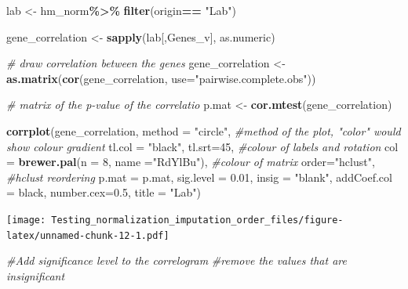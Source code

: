 \documentclass[
]{article}
\newenvironment{Shaded}{\begin{snugshade}}{\end{snugshade}}
\newcommand{\AttributeTok}[1]{\textcolor[rgb]{0.13,0.29,0.53}{#1}}
\newcommand{\CommentTok}[1]{\textcolor[rgb]{0.56,0.35,0.01}{\textit{#1}}}
\newcommand{\DecValTok}[1]{\textcolor[rgb]{0.00,0.00,0.81}{#1}}
\newcommand{\FloatTok}[1]{\textcolor[rgb]{0.00,0.00,0.81}{#1}}
\newcommand{\FunctionTok}[1]{\textcolor[rgb]{0.13,0.29,0.53}{\textbf{#1}}}
\newcommand{\NormalTok}[1]{#1}
\newcommand{\OtherTok}[1]{\textcolor[rgb]{0.56,0.35,0.01}{#1}}
\newcommand{\SpecialCharTok}[1]{\textcolor[rgb]{0.81,0.36,0.00}{\textbf{#1}}}
\newcommand{\StringTok}[1]{\textcolor[rgb]{0.31,0.60,0.02}{#1}}
\begin{document}
\begin{Shaded}
\begin{Highlighting}[]
\NormalTok{lab }\OtherTok{\textless{}{-}}\NormalTok{ hm\_norm}\SpecialCharTok{\%\textgreater{}\%}
    \FunctionTok{filter}\NormalTok{(origin}\SpecialCharTok{==} \StringTok{"Lab"}\NormalTok{)}

\NormalTok{gene\_correlation }\OtherTok{\textless{}{-}} \FunctionTok{sapply}\NormalTok{(lab[,Genes\_v], as.numeric)}

\CommentTok{\# draw correlation between the genes}
\NormalTok{gene\_correlation }\OtherTok{\textless{}{-}} \FunctionTok{as.matrix}\NormalTok{(}\FunctionTok{cor}\NormalTok{(gene\_correlation, }
                                  \AttributeTok{use=}\StringTok{"pairwise.complete.obs"}\NormalTok{))}

\CommentTok{\# matrix of the p{-}value of the correlatio}
\NormalTok{p.mat }\OtherTok{\textless{}{-}} \FunctionTok{cor.mtest}\NormalTok{(gene\_correlation)}

\FunctionTok{corrplot}\NormalTok{(gene\_correlation, }
         \AttributeTok{method =} \StringTok{"circle"}\NormalTok{,  }\CommentTok{\#method of the plot, "color" would show colour gradient}
         \AttributeTok{tl.col =} \StringTok{"black"}\NormalTok{, }\AttributeTok{tl.srt=}\DecValTok{45}\NormalTok{, }\CommentTok{\#colour of labels and rotation}
         \AttributeTok{col =} \FunctionTok{brewer.pal}\NormalTok{(}\AttributeTok{n =} \DecValTok{8}\NormalTok{, }\AttributeTok{name =}\StringTok{"RdYlBu"}\NormalTok{), }\CommentTok{\#colour of matrix}
         \AttributeTok{order=}\StringTok{"hclust"}\NormalTok{, }\CommentTok{\#hclust reordering}
         \AttributeTok{p.mat =}\NormalTok{ p.mat, }\AttributeTok{sig.level =} \FloatTok{0.01}\NormalTok{, }\AttributeTok{insig =} \StringTok{"blank"}\NormalTok{,}
         \AttributeTok{addCoef.col =} \StringTok{\textquotesingle{}black\textquotesingle{}}\NormalTok{,}
         \AttributeTok{number.cex=}\FloatTok{0.5}\NormalTok{,}
         \AttributeTok{title =} \StringTok{"Lab"}\NormalTok{) }
\end{Highlighting}
\end{Shaded}

\texttt{[image: Testing\_normalization\_imputation\_order\_files/figure-latex/unnamed-chunk-12-1.pdf]}

\begin{Shaded}
\begin{Highlighting}[]
  \CommentTok{\#Add significance level to the correlogram}
\CommentTok{\#remove the values that are insignificant}
\end{Highlighting}
\end{Shaded}
\end{document}
